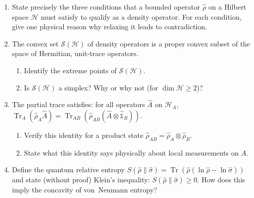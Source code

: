 \documentclass[11pt,a4paper]{article}
\begin{document}
\begin{tcolorbox}[gradconceptbox, title={Part I --- Structural Concept Probes \hfill\normalfont 5 $\times$ 2 pts = 10 pts}]

\begin{enumerate}[leftmargin=1.8em, label=\textbf{Q\arabic*.}, itemsep=10pt]

\item {}
  State precisely the three conditions that a bounded operator $\hat{\rho}$
  on a Hilbert space $\mathcal{H}$ must satisfy to qualify as a density operator.
  For each condition, give one physical reason why relaxing it leads to contradiction.

  \vspace{2cm}

\item {}
  The convex set $\mathcal{S}(\mathcal{H})$ of density operators is a proper convex subset
  of the space of Hermitian, unit-trace operators.
  \begin{enumerate}[label=(\alph*)]
    \item Identify the extreme points of $\mathcal{S}(\mathcal{H})$.
    \item Is $\mathcal{S}(\mathcal{H})$ a simplex? Why or why not (for $\dim\mathcal{H}\ge 2$)?
  \end{enumerate}

  \vspace{2.5cm}

\item {}
  The partial trace satisfies: for all operators $\hat{A}$ on $\mathcal{H}_A$,
  $\operatorname{Tr}_A(\hat{\rho}_A\hat{A})=\operatorname{Tr}_{AB}(\hat{\rho}_{AB}(\hat{A}\otimes\hat{\mathbb{1}}_B))$.
  \begin{enumerate}[label=(\alph*)]
    \item Verify this identity for a product state $\hat{\rho}_{AB}=\hat{\rho}_A\otimes\hat{\rho}_B$.
    \item State what this identity says physically about local measurements on $A$.
  \end{enumerate}

  \vspace{2.5cm}

\item {}
  Define the quantum relative entropy
  $S(\hat{\rho}\|\hat{\sigma})=\operatorname{Tr}(\hat{\rho}(\ln\hat{\rho}-\ln\hat{\sigma}))$
  and state (without proof) Klein's inequality: $S(\hat{\rho}\|\hat{\sigma})\ge 0$.
  How does this imply the concavity of von~Neumann entropy?


\end{enumerate}
\end{tcolorbox}
\end{document}
